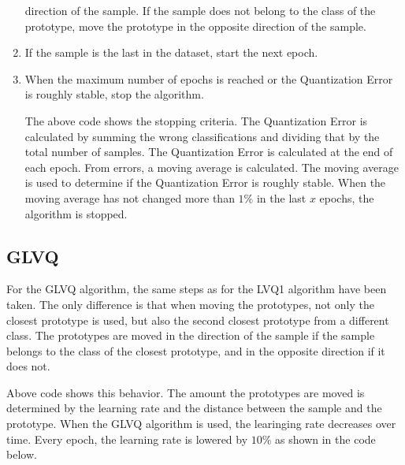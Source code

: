 \documentclass[twoside, a4paper, fleqn, reqno]{article}
\begin{document}
\begin{enumerate}
			direction of the sample. If the sample does not belong to the class of the prototype,
			move the prototype in the opposite direction of the sample.
			\begin{tabbing}
				
			\end{tabbing}
		\item If the sample is the last in the dataset, start the next epoch.
		\item When the maximum number of epochs is reached or the Quantization Error is roughly
			stable, stop the algorithm.
			\begin{tabbing}
				
			\end{tabbing}
			The above code shows the stopping criteria. The Quantization Error is calculated by
			summing the wrong classifications and dividing that by the total number of samples.
			The Quantization Error is calculated at the end of each epoch. From errors,
			a moving average is calculated. The moving average is used to determine if the
			Quantization Error is roughly stable. When the moving average has not changed
			more than $1\%$ in the last $x$ epochs, the algorithm is stopped.
	\end{enumerate}
\subsection*{GLVQ}
	For the GLVQ algorithm, the same steps as for the LVQ1 algorithm have been taken.
	The only difference is that when moving the prototypes, not only the closest prototype
	is used, but also the second closest prototype from a different class.
	The prototypes are moved in the direction of the sample if the sample belongs to the
	class of the closest prototype, and in the opposite direction if it does not.
	\begin{tabbing}
		
	\end{tabbing}
	Above code shows this behavior. The amount the prototypes are moved is determined by
	the learning rate and the distance between the sample and the prototype. When the
	GLVQ algorithm is used, the learinging rate decreases over time. Every epoch, the
	learning rate is lowered by $10\%$ as shown in the code below.
	\begin{tabbing}
		
	\end{tabbing}
\end{document}
